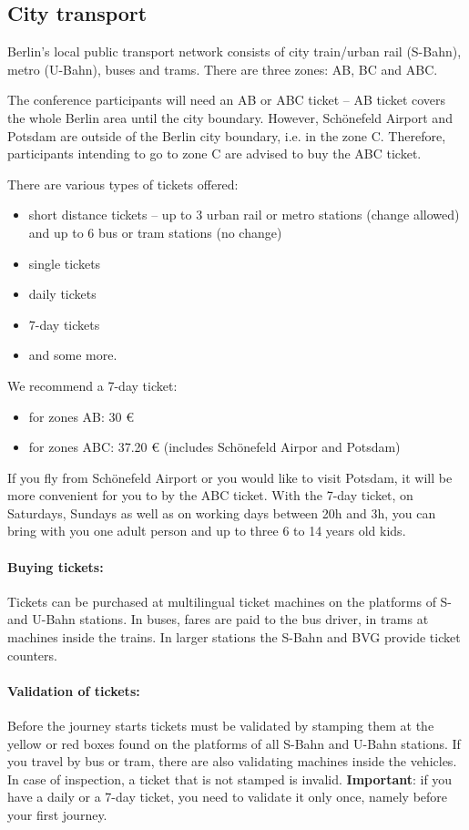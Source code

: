  \subsection{City transport}

 Berlin's local public transport network consists of city train/urban rail (S-Bahn), metro (U-Bahn), buses and trams. There are three zones: AB, BC and ABC.

The conference participants will need an AB or ABC ticket -- AB ticket covers the whole Berlin area until the city boundary. However, Sch\"{o}nefeld Airport and Potsdam are outside of the Berlin city boundary, i.e. in the zone C. Therefore, participants intending to go to zone C are advised to buy the ABC ticket.

There are various types of tickets offered:
\begin{itemize}
  \item short distance tickets -- up to 3 urban rail or metro stations (change allowed) and up to 6 bus or tram stations (no change)
  \item single tickets
  \item daily tickets
  \item 7-day tickets
  \item and some more.
\end{itemize}

We recommend a 7-day ticket:
\begin{itemize}
  \item for zones AB: 30 €
  \item for zones ABC: 37.20 € (includes Sch\"{o}nefeld Airpor and  Potsdam)
\end{itemize}

If you fly from Sch\"{o}nefeld Airport or you would like to visit Potsdam, it will be more convenient for you to by the ABC ticket. With the 7-day ticket, on Saturdays, Sundays as well as on working days between 20h and 3h, you can bring with you one adult person and up to three 6 to 14 years old kids.

\paragraph{Buying tickets:}
Tickets can be purchased at multilingual ticket machines on the platforms of S-and U-Bahn stations. In buses, fares are paid to the bus driver, in trams at machines inside the trains. In larger stations the S-Bahn and BVG provide ticket counters.

\paragraph{Validation of tickets:}
Before the journey starts tickets must be validated by stamping them at the yellow or red boxes found on the platforms of all S-Bahn and U-Bahn stations. If you travel by bus or tram, there are also validating machines inside the vehicles. In case of inspection, a ticket that is not stamped is invalid. \textbf{Important}: if you have a daily or a 7-day ticket, you need to validate it only once, namely before your first journey.

